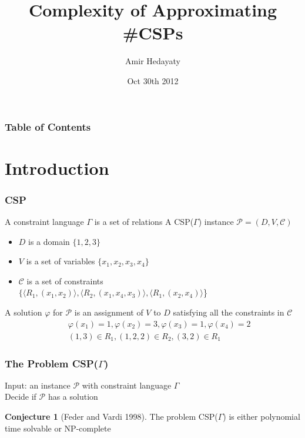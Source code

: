 \documentclass[a4paper,handout]{beamer}
\author{Amir Hedayaty}
\title{Complexity of Approximating \#CSPs}
\institute{Simon Fraser University}
\date{Oct 30th 2012}
\theoremstyle{definition}
\newtheorem{conj}{Conjecture}
\begin{document}
\begin{frame}
\titlepage
\end{frame}

\begin{frame}
\frametitle{Table of Contents}
\tableofcontents
\end{frame}

\section{Introduction}

\begin{frame}
\frametitle{CSP}
A \textcolor{mygreen}{constraint language} \(\Gamma\) is a set of relations
\pause {}
\vskip 12pt
A CSP(\(\Gamma\)) instance \(\mathcal{P} = (D, V, \mathcal{C})\)
\begin{itemize}
\item \(D\) is a domain  {\(\{1,2,3\}\)}
\item \(V\) is a set of variables  {\(\{x_1,x_2,x_3,x_4\}\)}
\item \(\mathcal{C}\) is a set of constraints \\
 {\(\{\langle R_1, (x_1,x_2)\rangle, \langle R_2, (x_1, x_4, x_3)\rangle, \langle R_1, (x_2,x_4) \rangle \)\}}
\end{itemize}
\vskip 12pt
\pause %
\vskip 12pt

\pause
A \textcolor{mygreen}{solution} \(\varphi\) for \(\mathcal{P}\) is an assignment of \(V\) to \(D\) satisfying all the constraints in \(\mathcal{C}\)
\pause
\begin{eqnarray*}
&&\varphi(x_1)=1, \varphi(x_2)=3, \varphi(x_3)=1, \varphi(x_4)=2 \\
&&(1,3) \in R_1, (1,2,2) \in R_2, (3,2) \in R_1
\end{eqnarray*}
\end{frame}

\begin{frame}
\frametitle{The Problem CSP(\(\Gamma\))}
\begin{definition} 
Input: an instance \(\mathcal{P}\) with constraint language \(\Gamma\) \\
Decide if \(\mathcal{P}\) has a solution
\end{definition}
\begin{conj} [Feder and Vardi 1998]
The problem CSP(\(\Gamma\)) is either polynomial time solvable or NP-complete
\end{conj}
\end{frame}
\end{document}
